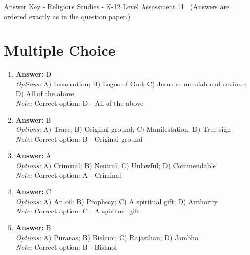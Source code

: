 \documentclass[12pt]{article}
\begin{document}
\begin{center}
Answer Key - Religious Studies - K-12 Level Assessment 11 \
\small (Answers are ordered exactly as in the question paper.)
\end{center}

\section*{Multiple Choice}
\begin{enumerate}[label=\arabic*.]
\item \textbf{Answer:} D
\\ \textit{Options:} A) Incarnation; B) Logos of God; C) Jesus as messiah and saviour; D) All of the above
\\ \textit{Note:} Correct option: D - All of the above
\item \textbf{Answer:} B
\\ \textit{Options:} A) Trace; B) Original ground; C) Manifestation; D) True sign
\\ \textit{Note:} Correct option: B - Original ground
\item \textbf{Answer:} A
\\ \textit{Options:} A) Criminal; B) Neutral; C) Unlawful; D) Commendable
\\ \textit{Note:} Correct option: A - Criminal
\item \textbf{Answer:} C
\\ \textit{Options:} A) An oil; B) Prophecy; C) A spiritual gift; D) Authority
\\ \textit{Note:} Correct option: C - A spiritual gift
\item \textbf{Answer:} B
\\ \textit{Options:} A) Puranas; B) Bishnoi; C) Rajasthan; D) Jambho
\\ \textit{Note:} Correct option: B - Bishnoi
\end{enumerate}
\end{document}
